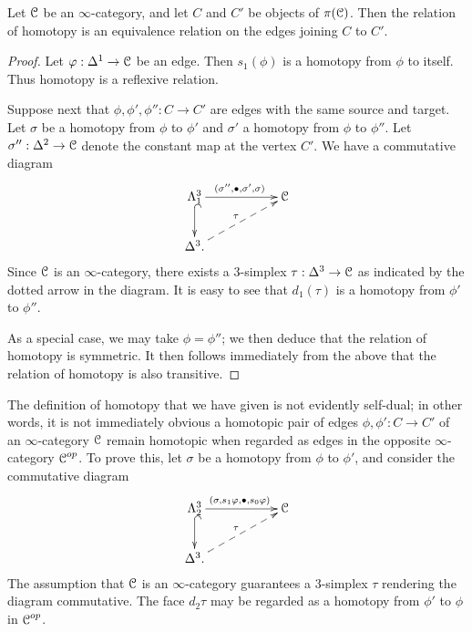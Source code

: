 \begin{1.2.3 The homotopy category}
\begin{proposition}\label{extneeded}
Let $\operatorname{\mathcal{C}}$ be an $\infty$-category, and let $C$ and $C'$ be objects of
$\pi(\operatorname{\mathcal{C}})$. Then the relation of homotopy is an equivalence relation
on the edges joining $C$ to $C'$.
\end{proposition}

\begin{proof}
Let $\varphi: \Delta^1 \rightarrow \operatorname{\mathcal{C}}$ be an edge. Then $s_1(\phi)$ is a homotopy from $\phi$ to
itself. Thus homotopy is a reflexive relation.

Suppose next that $\phi, \phi', \phi'': C \rightarrow C'$ are edges with the same source and target. Let $\sigma$
be a homotopy from $\phi$ to $\phi'$ and $\sigma'$ a homotopy from
$\phi$ to $\phi''$. Let $\sigma'': \Delta^2 \rightarrow \operatorname{\mathcal{C}}$ denote the
constant map at the vertex $C'$. 
We have a commutative diagram
$$ \xymatrix{ \Lambda^3_1 \ar@{^{(}->}[d] \ar[rr]^{ (\sigma'', \bigdot, \sigma', \sigma) } & & \calC \\
\Delta^3 \ar@{-->}[urr]^{\tau}. & & }$$
Since $\operatorname{\mathcal{C}}$ is an $\infty$-category, there exists a $3$-simplex $\tau: \Delta^3 \rightarrow \operatorname{\mathcal{C}}$ as indicated by the dotted arrow in the diagram. It is easy to see that
$d_1(\tau)$ is a homotopy from $\phi'$ to $\phi''$.

As a special case, we may take $\phi=\phi''$; we then deduce that
the relation of homotopy is symmetric. It then follows immediately
from the above that the relation of homotopy is also transitive.
\end{proof}

\begin{remark}\label{cello}
The definition of homotopy that we have given is not evidently self-dual; in other words, 
it is not immediately obvious a homotopic pair of edges $\phi, \phi': C \rightarrow C'$ of an $\infty$-category $\operatorname{\mathcal{C}}$ remain homotopic when regarded as edges in the opposite $\infty$-category $\operatorname{\mathcal{C}}^{op}$. To prove this, let $\sigma$ be a homotopy from $\phi$ to $\phi'$, and consider
the commutative diagram
$$ \xymatrix{ \Lambda^3_2 \ar@{^{(}->}[d] \ar[rr]^{ ( \sigma, s_1 \phi, \bigdot, s_0 \phi)} & & \calC \\
\Delta^3 \ar@{-->}[urr]^{\tau}. & & }$$
The assumption that $\operatorname{\mathcal{C}}$ is an $\infty$-category guarantees a $3$-simplex
$\tau$ rendering the diagram commutative. The face $d_2 \tau$ may be regarded as a homotopy
from $\phi'$ to $\phi$ in $\operatorname{\mathcal{C}}^{op}$.
\end{remark}


\end{1.2.3 The homotopy category}
